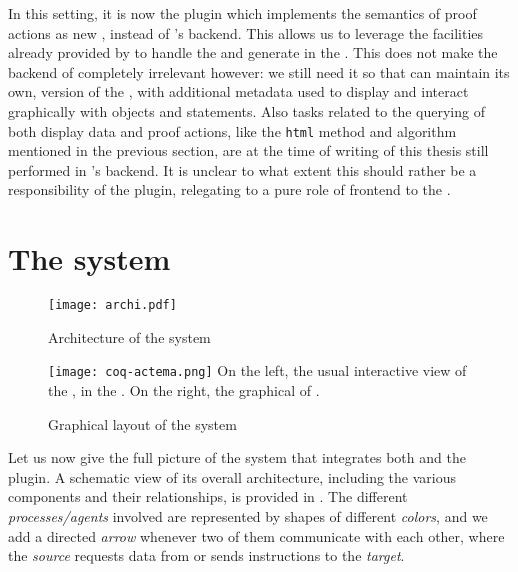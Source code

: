 In this setting, it is now the  plugin which implements the semantics of
proof actions as new , instead of 's backend. This allows
us to leverage the facilities already provided by  to handle the
 and generate  in the . This does not make the backend of  completely
irrelevant however: we still need it so that  can maintain its own,
 version of the , with additional metadata used
to display and interact graphically with objects and statements. Also tasks
related to the querying of both display data and proof actions, like the
\texttt{html} method and  algorithm mentioned in the previous
section, are at the time of writing of this thesis still performed in
's backend. It is unclear to what extent this should rather be a
responsibility of the  plugin, relegating  to a pure role of
frontend to the .

\section{The  system}

\begin{figure*}
  \texttt{[image: archi.pdf]}
  \caption{Architecture of the  system}
\end{figure*}

\begin{figure*}
  \texttt{[image: coq-actema.png]}
  \AP On the left, the usual interactive view of the , in the
    \cite{VsCoq}. On the right, the graphical  of
  .
  \caption{ Graphical layout of the  system}
\end{figure*}

Let us now give the full picture of the  system that integrates
both  and the  plugin. A schematic view of its overall
architecture, including the various components and their relationships, is
provided in . The different \emph{processes/agents} involved are
represented by shapes of different \emph{colors}, and we add a directed
\emph{arrow} whenever two of them communicate with each other, where the
\emph{source} requests data from or sends instructions to the \emph{target}.

